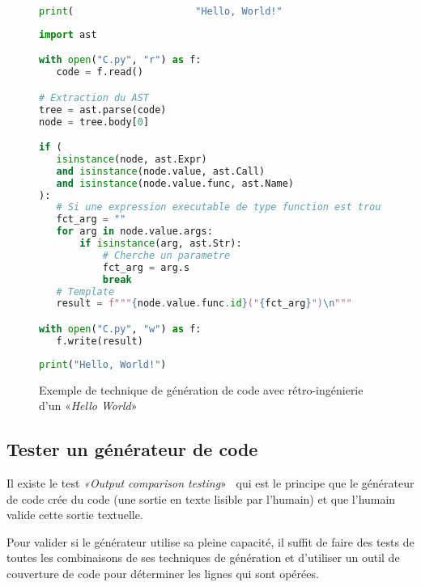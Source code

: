 \begin{figure}
\begin{lstlisting}[language=Python, upquote=true, caption={C mal formaté - fichier C.py de Figure~\ref{fig:exemple_gen_code_retro}}, label={lst:gen_code_retro_c}]
print(                     "Hello, World!"                         )
\end{lstlisting}

\begin{lstlisting}[language=Python, upquote=true, caption={M qui extrait µ$_C$ pour générer C.py de Figure~\ref{fig:exemple_gen_code_retro}}, label={lst:gen_code_retro_m}]
import ast

with open("C.py", "r") as f:
   code = f.read()

# Extraction du AST
tree = ast.parse(code)
node = tree.body[0]

if (
   isinstance(node, ast.Expr)
   and isinstance(node.value, ast.Call)
   and isinstance(node.value.func, ast.Name)
):
   # Si une expression executable de type function est trouve
   fct_arg = ""
   for arg in node.value.args:
       if isinstance(arg, ast.Str):
           # Cherche un parametre
           fct_arg = arg.s
           break
   # Template
   result = f"""{node.value.func.id}("{fct_arg}")\n"""

with open("C.py", "w") as f:
   f.write(result)
\end{lstlisting}

\begin{lstlisting}[language=Python, upquote=true, caption={C corrigé - fichier C.py de Figure~\ref{fig:exemple_gen_code_retro}}, label={lst:gen_code_retro_new_c}]
print("Hello, World!")
\end{lstlisting}
\caption{Exemple de technique de génération de code avec rétro-ingénierie d'un «\textit{Hello World}»}
\label{fig:exemple_gen_code_retro}
\end{figure}

\subsection{Tester un générateur de code}

Il existe le test \textit{«Output comparison testing}»~\cite{wikipedia_test_informatique} qui est le principe que le générateur de code crée du code (une sortie en texte lisible par l'humain) et que l'humain valide cette sortie textuelle.

Pour valider si le générateur utilise sa pleine capacité, il suffit de faire des tests de toutes les combinaisons de ses techniques de génération et d'utiliser un outil de couverture de code pour déterminer les lignes qui sont opérées.
